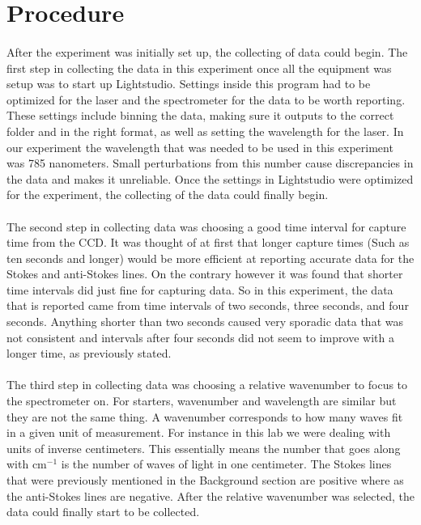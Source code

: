 \documentclass[]{article}
\begin{document}
\section{Procedure}
\begin{multicols}{2}
\paragraph{}
\setlength{\parskip}{1em}
After the experiment was initially set up, the collecting of data could begin. The first step in collecting the data in this experiment once all the equipment was setup was to start up Lightstudio. Settings inside this program had to be optimized for the laser and the spectrometer for the data to be worth reporting. These settings include binning the data, making sure it outputs to the correct folder and in the right format, as well as setting the wavelength for the laser. In our experiment the wavelength that was needed to be used in this experiment was 785 nanometers. Small perturbations from this number cause discrepancies in the data and makes it unreliable. Once the settings in Lightstudio were optimized for the experiment, the collecting of the data could finally begin. 
\paragraph{}
\setlength{\parskip}{1em}
The second step in collecting data was choosing a good time interval for capture time from the CCD. It was thought of at first that longer capture times (Such as ten seconds and longer) would be more efficient at reporting accurate data for the Stokes and anti-Stokes lines. On the contrary however it was found that shorter time intervals did just fine for capturing data. So in this experiment, the data that is reported came from time intervals of two seconds, three seconds, and four seconds. Anything shorter than two seconds caused very sporadic data that was not consistent and intervals after four seconds did not seem to improve with a longer time, as previously stated. 
\paragraph{}
\setlength{\parskip}{1em}
The third step in collecting data was choosing a relative wavenumber to focus to the spectrometer on. For starters, wavenumber and wavelength are similar but they are not the same thing. A wavenumber corresponds to how many waves fit in a given unit of measurement. For instance in this lab we were dealing with units of inverse centimeters. This essentially means the number that goes along with cm$^{-1}$ is the number of waves of light in one centimeter. The Stokes lines that were previously mentioned in the Background section are positive where as the anti-Stokes lines are negative. After the relative wavenumber was selected, the data could finally start to be collected.
\end{multicols}
\end{document}
